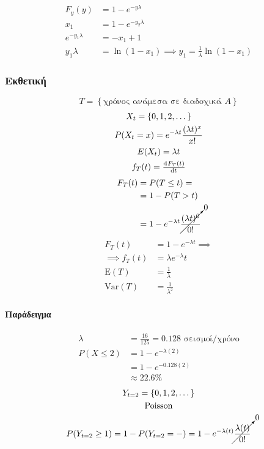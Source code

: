 \documentclass[11pt,a4paper,titlepage,draft]{article}
\newcommand{\textlatin}[1]{#1}
\begin{document}
\begin{align*}
F_y(y) &= 1-e^{-y\lambda }\\
x_1 &= 1-e^{-y_2\lambda } \\
e^{-y_1\lambda }&=-x_1+1\\
y_1\lambda &= \ln (1-x_1) \implies y_1 = \frac{1}{\lambda} \ln (1-x_1)
\end{align*}



\subsubsection{Εκθετική}
\[
T = \left\lbrace
\text{χρόνος ανάμεσα σε διαδοχικά \(A\)}
\right\rbrace
\]
\begin{gather*}
X_t = \left\lbrace 0,1,2,\dots \right\rbrace\\
P(X_t=x) = e^{-\lambda t} \frac{(\lambda t)^x}{x!} \\
E(X_t)=\lambda t\\
f_T(t) = \od{F_T(t)}{t}
\end{gather*}
\begin{align*}
F_T(t) &= P(T \leq t) =
\\ &=
1-P(T>t)
\\ &=
1-e^{-\lambda t}\cancelto{0}{\frac{(\lambda t)^0}{0!}}
\end{align*}
\begin{align*}
F_T(t) &= 1-e^{-\lambda t} \implies \\
\implies f_T(t) &= \lambda e^{-\lambda}t\\
\mathrm E(T) &= \frac{1}{\lambda }\\
\mathrm{Var}(T) &= \frac{1}{\lambda ^2}
\end{align*}

\paragraph{Παράδειγμα}
\begin{align*}
\lambda &= \frac{16}{125} = 0.128 \text{ σεισμοί/χρόνο} \\
P(X \leq 2) &= 1-e^{-\lambda (2)} \\
&= 1-e^{-0.128 (2)} \\
&\approx 22.6\%
\end{align*}
\begin{gather*}
Y_{t=2} = \left\lbrace 0,1,2,\dots \right\rbrace\\
\text{\textlatin{Poisson}} \\
P(Y_{t=2} \geq 1) = 1 - P(Y_{t=2} = -) = 1 - e^{-\lambda (t)} \cancelto{0}{\frac{\lambda (t)}{0!}}
\end{gather*}
\end{document}
